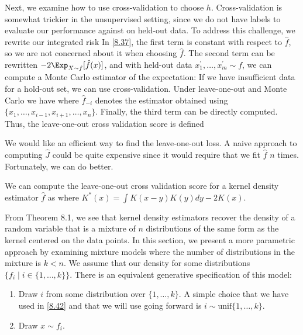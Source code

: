 Next, we examine how to use cross-validation to choose $h$. Cross-validation is somewhat trickier in the unsupervised setting, since we do not have labels to evaluate our performance against on held-out data. To address this challenge, we rewrite our integrated risk
In \eqref{8.37}, the first term is constant with respect to $\hat{f}$, so we are not concerned about it when choosing $\hat{f}$. The second term can be rewritten $-2\Exp_{X \sim f}[\hat{f}(x)]$, and with held-out data $x_1^\prime, \dots,  x_m^\prime \sim f$, we can compute a Monte Carlo estimator of the expectation:  
If we have insufficient data for a hold-out set, we can use cross-validation. Under leave-one-out and Monte Carlo we have
where $\hat{f}_{-i}$ denotes the estimator obtained using $\{x_1, \dots, x_{i-1}, x_{i+1}, \dots, x_{n}\}$. Finally, the third term can be directly computed. Thus, the leave-one-out cross validation score is defined

We would like an efficient way to find the leave-one-out loss. A naive approach to computing $\hat{J}$ could be quite expensive since it would require that we fit $\hat{f}$ $n$ times. Fortunately, we can do better. 

\begin{theorem}
We can compute the leave-one-out cross validation score for a kernel density estimator $\hat{f}$ as
where $K^*(x) = \int K(x-y)K(y)dy - 2K(x)$.
\end{theorem}



From Theorem 8.1, we see that kernel density estimators recover the density of a random variable that is a mixture of $n$ distributions of the same form as the kernel centered on the data points. In this section, we present a more parametric approach by examining mixture models where the number of distributions in the mixture is $k < n$. We assume that our density
for some distributions $\{f_i \mid i \in \{1, \dots, k\} \}$. There is an equivalent generative specification of this model:
\begin{enumerate}
    \item Draw $i$ from some distribution over $\{1, \dots, k\}$. A simple choice that we have used in \eqref{8.42} and that we will use going forward is $i \sim \text{unif}\{1, \dots, k\}$. 
    \item Draw $x \sim f_i$.
\end{enumerate}

